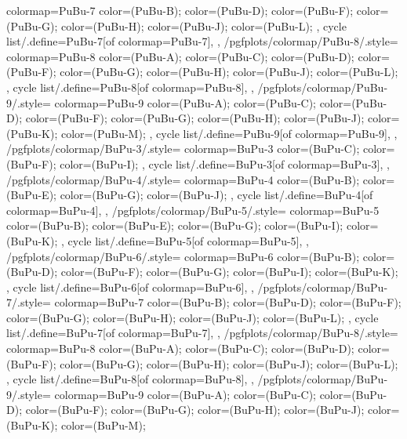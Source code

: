{{    colormap={PuBu-7}{
      color=(PuBu-B);
      color=(PuBu-D);
      color=(PuBu-F);
      color=(PuBu-G);
      color=(PuBu-H);
      color=(PuBu-J);
      color=(PuBu-L);
    },
    cycle list/.define={PuBu-7}{[of colormap=PuBu-7]},
  },
  /pgfplots/colormap/PuBu-8/.style={
    colormap={PuBu-8}{
      color=(PuBu-A);
      color=(PuBu-C);
      color=(PuBu-D);
      color=(PuBu-F);
      color=(PuBu-G);
      color=(PuBu-H);
      color=(PuBu-J);
      color=(PuBu-L);
    },
    cycle list/.define={PuBu-8}{[of colormap=PuBu-8]},
  },
  /pgfplots/colormap/PuBu-9/.style={
    colormap={PuBu-9}{
      color=(PuBu-A);
      color=(PuBu-C);
      color=(PuBu-D);
      color=(PuBu-F);
      color=(PuBu-G);
      color=(PuBu-H);
      color=(PuBu-J);
      color=(PuBu-K);
      color=(PuBu-M);
    },
    cycle list/.define={PuBu-9}{[of colormap=PuBu-9]},
  },
  /pgfplots/colormap/BuPu-3/.style={
    colormap={BuPu-3}{
      color=(BuPu-C);
      color=(BuPu-F);
      color=(BuPu-I);
    },
    cycle list/.define={BuPu-3}{[of colormap=BuPu-3]},
  },
  /pgfplots/colormap/BuPu-4/.style={
    colormap={BuPu-4}{
      color=(BuPu-B);
      color=(BuPu-E);
      color=(BuPu-G);
      color=(BuPu-J);
    },
    cycle list/.define={BuPu-4}{[of colormap=BuPu-4]},
  },
  /pgfplots/colormap/BuPu-5/.style={
    colormap={BuPu-5}{
      color=(BuPu-B);
      color=(BuPu-E);
      color=(BuPu-G);
      color=(BuPu-I);
      color=(BuPu-K);
    },
    cycle list/.define={BuPu-5}{[of colormap=BuPu-5]},
  },
  /pgfplots/colormap/BuPu-6/.style={
    colormap={BuPu-6}{
      color=(BuPu-B);
      color=(BuPu-D);
      color=(BuPu-F);
      color=(BuPu-G);
      color=(BuPu-I);
      color=(BuPu-K);
    },
    cycle list/.define={BuPu-6}{[of colormap=BuPu-6]},
  },
  /pgfplots/colormap/BuPu-7/.style={
    colormap={BuPu-7}{
      color=(BuPu-B);
      color=(BuPu-D);
      color=(BuPu-F);
      color=(BuPu-G);
      color=(BuPu-H);
      color=(BuPu-J);
      color=(BuPu-L);
    },
    cycle list/.define={BuPu-7}{[of colormap=BuPu-7]},
  },
  /pgfplots/colormap/BuPu-8/.style={
    colormap={BuPu-8}{
      color=(BuPu-A);
      color=(BuPu-C);
      color=(BuPu-D);
      color=(BuPu-F);
      color=(BuPu-G);
      color=(BuPu-H);
      color=(BuPu-J);
      color=(BuPu-L);
    },
    cycle list/.define={BuPu-8}{[of colormap=BuPu-8]},
  },
  /pgfplots/colormap/BuPu-9/.style={
    colormap={BuPu-9}{
      color=(BuPu-A);
      color=(BuPu-C);
      color=(BuPu-D);
      color=(BuPu-F);
      color=(BuPu-G);
      color=(BuPu-H);
      color=(BuPu-J);
      color=(BuPu-K);
      color=(BuPu-M);
}}}
